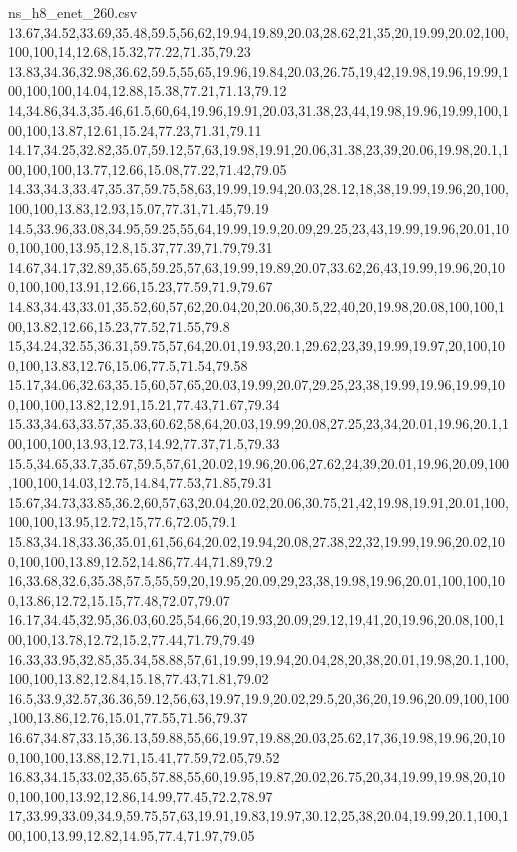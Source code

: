 \begin{filecontents*}[overwrite]{ns_h8_enet_260.csv}
13.67,34.52,33.69,35.48,59.5,56,62,19.94,19.89,20.03,28.62,21,35,20,19.99,20.02,100,100,100,14,12.68,15.32,77.22,71.35,79.23
13.83,34.36,32.98,36.62,59.5,55,65,19.96,19.84,20.03,26.75,19,42,19.98,19.96,19.99,100,100,100,14.04,12.88,15.38,77.21,71.13,79.12
14,34.86,34.3,35.46,61.5,60,64,19.96,19.91,20.03,31.38,23,44,19.98,19.96,19.99,100,100,100,13.87,12.61,15.24,77.23,71.31,79.11
14.17,34.25,32.82,35.07,59.12,57,63,19.98,19.91,20.06,31.38,23,39,20.06,19.98,20.1,100,100,100,13.77,12.66,15.08,77.22,71.42,79.05
14.33,34.3,33.47,35.37,59.75,58,63,19.99,19.94,20.03,28.12,18,38,19.99,19.96,20,100,100,100,13.83,12.93,15.07,77.31,71.45,79.19
14.5,33.96,33.08,34.95,59.25,55,64,19.99,19.9,20.09,29.25,23,43,19.99,19.96,20.01,100,100,100,13.95,12.8,15.37,77.39,71.79,79.31
14.67,34.17,32.89,35.65,59.25,57,63,19.99,19.89,20.07,33.62,26,43,19.99,19.96,20,100,100,100,13.91,12.66,15.23,77.59,71.9,79.67
14.83,34.43,33.01,35.52,60,57,62,20.04,20,20.06,30.5,22,40,20,19.98,20.08,100,100,100,13.82,12.66,15.23,77.52,71.55,79.8
15,34.24,32.55,36.31,59.75,57,64,20.01,19.93,20.1,29.62,23,39,19.99,19.97,20,100,100,100,13.83,12.76,15.06,77.5,71.54,79.58
15.17,34.06,32.63,35.15,60,57,65,20.03,19.99,20.07,29.25,23,38,19.99,19.96,19.99,100,100,100,13.82,12.91,15.21,77.43,71.67,79.34
15.33,34.63,33.57,35.33,60.62,58,64,20.03,19.99,20.08,27.25,23,34,20.01,19.96,20.1,100,100,100,13.93,12.73,14.92,77.37,71.5,79.33
15.5,34.65,33.7,35.67,59.5,57,61,20.02,19.96,20.06,27.62,24,39,20.01,19.96,20.09,100,100,100,14.03,12.75,14.84,77.53,71.85,79.31
15.67,34.73,33.85,36.2,60,57,63,20.04,20.02,20.06,30.75,21,42,19.98,19.91,20.01,100,100,100,13.95,12.72,15,77.6,72.05,79.1
15.83,34.18,33.36,35.01,61,56,64,20.02,19.94,20.08,27.38,22,32,19.99,19.96,20.02,100,100,100,13.89,12.52,14.86,77.44,71.89,79.2
16,33.68,32.6,35.38,57.5,55,59,20,19.95,20.09,29,23,38,19.98,19.96,20.01,100,100,100,13.86,12.72,15.15,77.48,72.07,79.07
16.17,34.45,32.95,36.03,60.25,54,66,20,19.93,20.09,29.12,19,41,20,19.96,20.08,100,100,100,13.78,12.72,15.2,77.44,71.79,79.49
16.33,33.95,32.85,35.34,58.88,57,61,19.99,19.94,20.04,28,20,38,20.01,19.98,20.1,100,100,100,13.82,12.84,15.18,77.43,71.81,79.02
16.5,33.9,32.57,36.36,59.12,56,63,19.97,19.9,20.02,29.5,20,36,20,19.96,20.09,100,100,100,13.86,12.76,15.01,77.55,71.56,79.37
16.67,34.87,33.15,36.13,59.88,55,66,19.97,19.88,20.03,25.62,17,36,19.98,19.96,20,100,100,100,13.88,12.71,15.41,77.59,72.05,79.52
16.83,34.15,33.02,35.65,57.88,55,60,19.95,19.87,20.02,26.75,20,34,19.99,19.98,20,100,100,100,13.92,12.86,14.99,77.45,72.2,78.97
17,33.99,33.09,34.9,59.75,57,63,19.91,19.83,19.97,30.12,25,38,20.04,19.99,20.1,100,100,100,13.99,12.82,14.95,77.4,71.97,79.05

\end{filecontents*}
